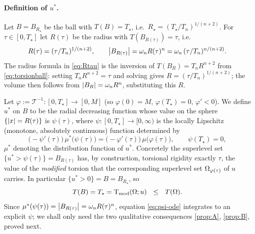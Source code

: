 \paragraph{Definition of $u^*$.}
Let $B=B_{R_\star}$ be the ball with $T(B)=T_\star$, i.e.\
$R_\star=(T_\star/T_n)^{1/(n+2)}$. For $\tau\in[0,T_\star]$ let $R(\tau)$ be
the radius with $T(B_{R(\tau)})=\tau$, i.e.\
\begin{equation}\label{eq:Rtau}
  R(\tau)=(\tau/T_n)^{1/(n+2)},\qquad
  \left|B_{R(\tau)}\right|=\omega_n R(\tau)^n
  =\omega_n\,(\tau/T_n)^{n/(n+2)}.
\end{equation}
The radius formula in \eqref{eq:Rtau} is the inversion of
$T(B_R)=T_n R^{n+2}$ from \eqref{eq:torsionball}: setting $T_n R^{n+2}=\tau$
and solving gives $R=(\tau/T_n)^{1/(n+2)}$; the volume then follows from
$\left|B_R\right|=\omega_n R^n$, substituting this $R$.

Let $\varphi:=\mathcal T^{-1}:[0,T_\star]\to[0,M]$ (so $\varphi(0)=M$,
$\varphi(T_\star)=0$, $\varphi'<0$). We define $u^*$ on $B$ to be the radial
decreasing function whose value on the sphere $\{\left|x\right|=R(\tau)\}$ is
$\psi(\tau)$, where $\psi:[0,T_\star]\to[0,\infty)$ is the
locally Lipschitz (monotone, absolutely continuous) function determined by
\begin{equation}\label{eq:psi-ode}
  \bigl(-\psi'(\tau)\bigr)\,\mu^*\!\bigl(\psi(\tau)\bigr)
  =\bigl(-\varphi'(\tau)\bigr)\,\mu\!\bigl(\varphi(\tau)\bigr),
  \qquad \psi(T_\star)=0,
\end{equation}
$\mu^*$ denoting the distribution function of $u^*$. Concretely the
superlevel set $\{u^*>\psi(\tau)\}=B_{R(\tau)}$ has, by construction,
torsional rigidity exactly $\tau$, the value of the \emph{modified}
torsion that the corresponding superlevel set $\Omega_{\varphi(\tau)}$ of $u$
carries. In particular $\{u^*>0\}=B=B_{R_\star}$, so
\begin{equation}\label{eq:TB}
  T(B)=T_\star=\operatorname{T_{\mathrm{mod}}}(\Omega;u)\ \ \le\ \ T(\Omega).
\end{equation}
Since $\mu^*(\psi(\tau))=\left|B_{R(\tau)}\right|=\omega_n R(\tau)^n$, equation
\eqref{eq:psi-ode} integrates to an explicit $\psi$; we shall only need the
two qualitative consequences \ref{prop:A}, \ref{prop:B}, proved next.

